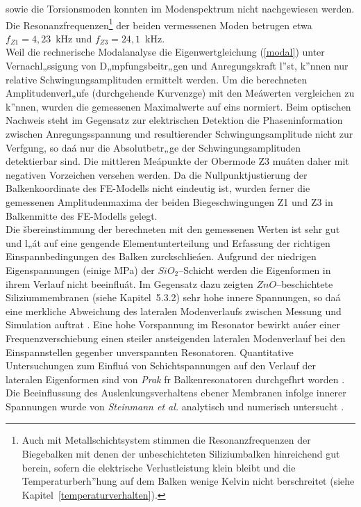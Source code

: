 sowie die Torsionsmoden konnten im Modenspektrum nicht nachgewiesen
werden. Die Resonanzfrequenzen\footnote{Auch mit Metallschichtsystem
stimmen die Resonanzfrequenzen der Biegebalken mit denen der unbeschichteten
Siliziumbalken hinreichend gut berein, sofern die elektrische
Verlustleistung klein bleibt und die Temperaturberh”hung auf dem Balken
wenige Kelvin nicht berschreitet (siehe Kapitel~\ref{temperaturverhalten}).}
der beiden vermessenen Moden betrugen etwa $f_{Z1} = 4,23$~kHz und
$f_{Z3} = 24,1$~kHz.\\
Weil die rechnerische Modalanalyse
die Eigenwertgleichung (\ref{modal}) unter Vernachl„ssigung von
D„mpfungsbeitr„gen und Anregungskraft l”st, k”nnen nur relative
Schwingungsamplituden ermittelt werden. Um die berechneten
Amplitudenverl„ufe (durchgehende Kurvenzge) mit den Meáwerten vergleichen
zu k”nnen, wurden die gemessenen Maximalwerte auf eins normiert.
Beim optischen Nachweis steht im Gegensatz zur elektrischen Detektion
die Phaseninformation zwischen
Anregungsspannung und resultierender Schwingungsamplitude nicht zur
Verfgung, so daá nur die Absolutbetr„ge der Schwingungsamplituden
detektierbar sind. Die mittleren Meápunkte der Obermode Z3 muáten daher
mit negativen Vorzeichen versehen werden.
Da die Nullpunktjustierung der Balkenkoordinate des FE-Modells nicht
eindeutig ist, wurden ferner die gemessenen Amplitudenmaxima der beiden
Biegeschwingungen Z1 und Z3 in Balkenmitte des FE-Modells gelegt.\\
%
Die šbereinstimmung der berechneten mit den gemessenen Werten ist sehr gut
und l„át auf eine gengende Elementunterteilung und Erfassung der
richtigen Einspannbedingungen des Balken zurckschlieáen. Aufgrund der
niedrigen Eigenspannungen (einige MPa) der $SiO_{2}$--Schicht werden die
Eigenformen in ihrem Verlauf nicht beeinfluát. Im Gegensatz dazu zeigten
$ZnO$--beschichtete Siliziummembranen (siehe Kapitel~5.3.2) sehr hohe innere
Spannungen, so daá eine merkliche Abweichung des lateralen Modenverlaufs
zwischen Messung und Simulation auftrat \cite{Fab92b}. Eine hohe Vorspannung
im Resonator bewirkt auáer einer
Frequenzverschiebung einen steiler ansteigenden lateralen Modenverlauf bei
den Einspannstellen gegenber unverspannten Resonatoren.
Quantitative Untersuchungen zum Einfluá von
Schichtspannungen auf den Verlauf der lateralen Eigenformen sind von
{\sl Prak} fr Balkenresonatoren durchgefhrt worden \cite{Pra93}. Die
Beeinflussung des Auslenkungsverhaltens ebener Membranen infolge innerer
Spannungen wurde von {\sl Steinmann et al.} analytisch und numerisch
untersucht \cite{Ste93}.

